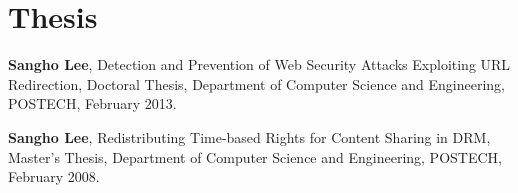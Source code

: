 \documentclass[letterpaper]{article}
\renewenvironment{itemize}{
  \begin{list}{}{
    \setlength{\leftmargin}{1.5em}
  }
}{
  \end{list}
}
\begin{document}



\section*{Thesis}
\begin{itemize}
 \item
 {\bf Sangho Lee},
 Detection and Prevention of Web Security Attacks Exploiting URL Redirection,
 Doctoral Thesis, Department of Computer Science and Engineering, POSTECH, 
 February 2013.
 \item
 {\bf Sangho Lee},
 Redistributing Time-based Rights for Content Sharing in DRM, 
 Master's Thesis, Department of Computer Science and Engineering, POSTECH, 
 February 2008.
\end{itemize}
\end{document}
